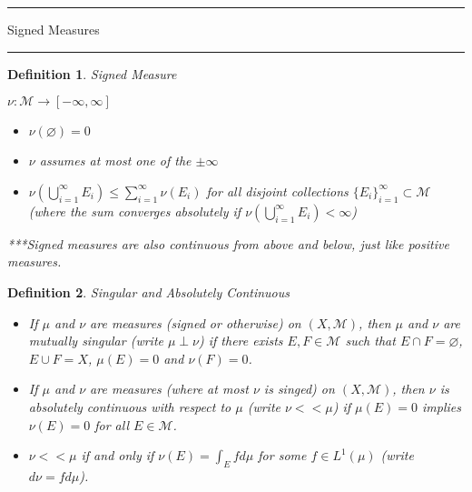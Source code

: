 \documentclass[12pt]{Qual}
\newtheorem{definition}{Definition}
\begin{document}
\begin{center}
\noindent\textcolor{blue!60!black}{\rule{15cm}{1mm}}
\Huge \faBug\faPuzzlePiece\faCoffee Signed Measures \faCoffee\faPuzzlePiece\faBug
\vspace{-0.5cm}
\noindent\textcolor{blue!60!black}{\rule{15cm}{1mm}}
\end{center}
\vspace{0.5cm}
\begin{definition}{\Large\textit{Signed Measure}}
$\,$

$\nu:\mathscr{M}\to[-\infty,\infty]$
\begin{itemize}
\setlength\itemsep{-0.1em}
\renewcommand\labelitemi{\faCoffee}
    \item $\nu(\varnothing)=0$
    \item $\nu$ assumes at most one of the $\pm\infty$
    \item $\displaystyle \nu\left(\bigcup_{i=1}^\infty E_i\right)\le\sum_{i=1}^\infty\nu(E_i)$ for all disjoint collections $\{E_i\}_{i=1}^\infty\subset\mathscr{M}$ (where the sum converges absolutely if $\displaystyle\nu\left(\bigcup_{i=1}^\infty E_i\right)<\infty$)
\end{itemize}

***Signed measures are also continuous from above and below, just like positive measures.

\end{definition}
\vspace{0.5cm}
\begin{definition}{\Large\textit{Singular and Absolutely Continuous}}
$\,$

\begin{itemize}
\setlength\itemsep{-0.1em}
\renewcommand\labelitemi{\faCoffee}
    \item If $\mu$ and $\nu$ are measures (signed or otherwise) on $(X,\mathscr{M})$, then $\mu$ and $\nu$  are mutually singular (write $\mu\perp\nu$) if there exists $E,F\in\mathscr{M}$ such that $E\cap F=\varnothing$, $E\cup F=X$, $\mu(E)=0$ and $\nu(F)=0$.
    \item If $\mu$ and $\nu$ are measures (where at most $\nu$ is singed) on $(X,\mathscr{M})$, then $\nu$ is absolutely continuous with respect to $\mu$ (write $\nu<<\mu$) if $\mu(E)=0$ implies $\nu(E)=0$ for all $E\in\mathscr{M}$.
    \item $\nu<<\mu$ if and only if $\nu(E)=\int_Efd\mu$ for some $f\in L^1(\mu)$ (write $d\nu=fd\mu$).
\end{itemize}


\end{definition}
\end{document}
